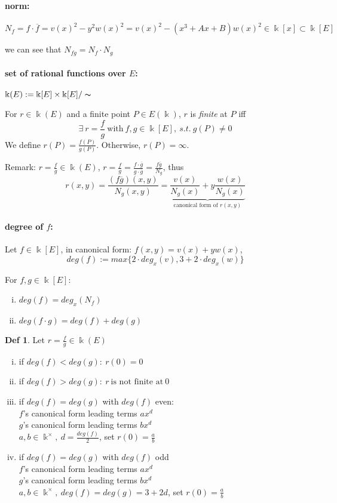 \documentclass{article}
\theoremstyle{definition}
\newtheorem{definition}{Def}[section]
\begin{document}
\paragraph{norm:} $N_f = f \cdot \overline{f} = v(x)^2 - y^2 w(x)^2 = v(x)^2 - (x^3 + Ax + B) w(x)^2 \in \Bbbk[x] \subset \Bbbk[E]$

we can see that $N_{fg} = N_f \cdot N_g$

\paragraph{set of rational functions over $E$:}
$\Bbbk(E) := \Bbbk[E] \times \Bbbk[E]/ \thicksim$

For $r\in \Bbbk(E)$ and a finite point $P \in E(\Bbbk)$, $r$ is \emph{finite} at $P$ iff
$$\exists~ r=\frac{f}{g} ~\text{with}~ f,g \in \Bbbk[E],~ s.t.~ g(P) \neq 0$$
We define $r(P)=\frac{f(P)}{g(P)}$. Otherwise, $r(P)=\infty$.

Remark: $r=\frac{f}{g} \in \Bbbk(E)$, $r=\frac{f}{g}=\frac{f \cdot \overline{g}}{g \cdot \overline{g}} = \frac{f \overline{g}}{N_g}$, thus
$$r(x,y)=\frac{ (f \overline{g})(x,y)}{N_g(x,y)} = \underbrace{ \frac{v(x)}{N_g(x)} + y \frac{w(x)}{N_g(x)} }_\text{canonical form of $r(x,y)$}$$

\paragraph{degree of $f$:} Let $f\in \Bbbk[E]$, in canonical form: $f(x,y) = v(x) + y w(x)$,
$$deg(f) := max\{ 2 \cdot deg_x(v), 3+2 \cdot deg_x(w) \}$$

For $f,g \in \Bbbk[E]$:
\begin{enumerate}[i.]
  \item $deg(f) = deg_x(N_f)$
  \item $deg(f \cdot g) = deg(f) + deg(g)$
\end{enumerate}

\begin{definition}
  Let $r=\frac{f}{g} \in \Bbbk(E)$
  \begin{enumerate}[i.]
    \item if $deg(f) < deg(g):~ r(0)=0$
    \item if $deg(f) > deg(g):~ r ~\text{is not finite at}~ 0$
    \item if $deg(f) = deg(g)$ with $deg(f)$ even:\\
      $f$'s canonical form leading terms $ax^d$\\
      $g$'s canonical form leading terms $bx^d$\\
      $a,b \in \Bbbk^\times,~ d=\frac{deg(f)}{2}$, set $r(0)=\frac{a}{b}$
    \item if $deg(f) = deg(g)$ with $deg(f)$ odd\\
      $f$'s canonical form leading terms $ax^d$\\
      $g$'s canonical form leading terms $bx^d$\\
      $a,b \in \Bbbk^\times,~ deg(f)=deg(g)=3+2d$, set $r(0)=\frac{a}{b}$
  \end{enumerate}
\end{definition}
\end{document}
